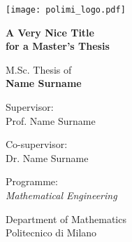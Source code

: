 
\newcommand{\myName}{Name Surname}
\newcommand{\myTitle}{A Very Nice Title \protect\\ for a Master's Thesis}
\newcommand{\myDegree}{Programme: \protect\\ \textit{Mathematical Engineering}}
\newcommand{\myCycle}{XXXI cycle}
\newcommand{\myDepartment}{Department of Mathematics}
\newcommand{\myUni}{Politecnico di Milano}
\newcommand{\myYear}{2019}
\newcommand{\myTime}{01 Jan \myYear}

\begin{titlepage}
	\texttt{[image: polimi\_logo.pdf]}
    \begin{addmargin}[3cm]{-1cm}
		\setlength{\parindent}{0pt}
		\vfill
		
		{\Huge\bfseries\myTitle}
        
        \vspace{2cm}
        
        {\Large M.Sc. Thesis of\\[0.125cm]}
        {\LARGE\bfseries\myName}
        
        \vspace{1cm}
        
        \large
        Supervisor:\\[0.125cm]
        {\Large Prof. Name Surname}
        
        \vspace{0.5cm}
        
        \large
        Co-supervisor:\\[0.125cm]
        {\Large Dr. Name Surname}
        
        \vspace{2cm}
        
       	\myDegree
	    	
	    \vspace{0.5cm}
	     
	    \myDepartment \\
	    \myUni
        
        \vfill
    \end{addmargin}
\end{titlepage}
